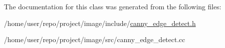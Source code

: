 The documentation for this class was generated from the following files\+:\begin{DoxyCompactItemize}
\item 
/home/user/repo/project/image/include/\hyperlink{canny__edge__detect_8h}{canny\+\_\+edge\+\_\+detect.\+h}\item 
/home/user/repo/project/image/src/canny\+\_\+edge\+\_\+detect.\+cc\end{DoxyCompactItemize}

